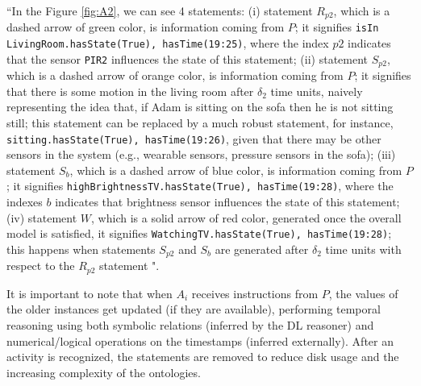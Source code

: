 \documentclass{thesisreport}
\begin{document}
 ``In the Figure \ref{fig:A2}, we can see 4 statements: (i) statement $R_{p2}$, which is a dashed arrow of green color, is information coming from $P$; it signifies \texttt{isIn LivingRoom.{hasState(True), hasTime(19:25)}}, where the index $p2$ indicates that the sensor \texttt{PIR2} influences the state of this statement; (ii) statement $S_{p2}$, which is a dashed arrow of orange color, is information coming from $P$; it signifies that there is some motion in the living room after $\delta_2$ time units, naively representing the idea that, if Adam is sitting on the sofa then he is not sitting still; this statement can be replaced by a much robust statement, for instance, \texttt{sitting.{hasState(True), hasTime(19:26)}}, given that there may be other sensors in the system (e.g., wearable sensors, pressure sensors in the sofa); (iii) statement $S_b$, which is a dashed arrow of blue color, is information coming from $P$; it signifies \texttt{highBrightnessTV.{hasState(True), hasTime(19:28)}}, where the indexes $b$ indicates that brightness sensor influences the state of this statement; (iv) statement $W$, which is a solid arrow of red color, generated once the overall model is satisfied, it signifies \texttt{WatchingTV.{hasState(True), hasTime(19:28)}}; this happens when statements $S_{p2}$ and $S_b$ are generated after $\delta_2$ time units with respect to the $R_{p2}$ statement \cite{kareem2018arianna}".
 

 It is important to note that when $A_i$ receives instructions from $P$, the values of the older instances get updated (if they are available), performing temporal reasoning using both symbolic relations (inferred by the DL reasoner) and numerical/logical operations on the timestamps (inferred externally). 
 After an activity is recognized, the statements are removed to reduce disk usage and the increasing complexity of the ontologies. 
 
 
\end{document}

